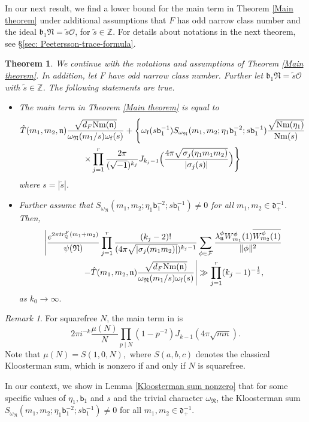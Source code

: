 \documentclass[reqno]{amsart}
\theoremstyle{plain}
\newtheorem{theorem}{Theorem}
\theoremstyle{definition}
\theoremstyle{remark}
\newtheorem{remark}{Remark}
\def\Nr{\mathrm{Nm}}
\def\b{\mathtt b}
\begin{document}
In our next result, we find a lower bound for the main term in Theorem \ref{Main theorem} under additional assumptions that $F$ has odd narrow class number and the ideal $\mathfrak{b}_1\mathfrak{N}= \tilde{s}\mathcal{O} $, for $\tilde{s}\in \mathbb{Z}$.  
For details about notations in the next theorem, see \S\ref{sec: Peetersson-trace-formula}.
\begin{theorem}\label{Single term}
 We continue with the notations and assumptions of Theorem \ref{Main theorem}. In addition, let $F$ have odd narrow class number.  Further let $\mathfrak{b}_1\mathfrak{N}=\tilde{s}\mathcal{O} $ with $\tilde{s}\in \mathbb{Z}$. The following statements are true.
 \begin{itemize}
 \item[{\bf(a)}] The main term in Theorem \ref{Main theorem} is equal to
\begin{multline*}
\Hat{T}(m_1,m_2,\mathfrak{n})\frac{\sqrt{d_F\Nr (\mathfrak{n})}}{\omega_\mathfrak{N}(m_1/s)\omega_{\mathrm{f}}(s)} + \Bigg\{ \omega_{\mathrm{f}}(s\b_1^{-1} ) S_{\omega_\mathfrak{N}} (m_1,m_2;\eta_1 \b_1^{-2};s\b_1^{-1})  \frac{\sqrt{\Nr (\eta_1)}}{\Nr(s)} \\\times \prod_{j=1}^r\frac{2\pi}{(\sqrt{-1})^{k_j}}J_{k_j-1} \Big(  \frac{4 \pi\sqrt{\sigma_j (\eta_1 m_1m_2 )}}{|\sigma_j(s)|}\Big)
 \Bigg\} 
 \end{multline*}
 where $s=|\tilde{s}|.$
  \item[{\bf(b)}]   
Further assume that  $S_{\omega_\mathfrak{N}} (m_{1},m_{2};\eta_1 \b_1^{-2};s\b_1^{-1})\neq 0$ for all $m_1,m_2 \in \mathfrak{d}^{-1}_+$. Then, 
\begin{align*}
 \Bigg| \frac{e^{2\pi tr_{\mathbb{Q}}^F ( m_{1}+ m_{2})}}{{\psi(\mathfrak{N})}} \prod_{j=1}^r  \frac{(k_j-2)!}{(4\pi \sqrt{|\sigma_j( m_{1} m_{2})|})^{k_j-1}} 
& \sum_{{\phi}\in \mathcal{F} }\frac{\lambda_\mathfrak{n}^\phi W_{ m_{1}}^\phi(1) \overline{W_{ m_{2}}^\phi(1)}}{\|\phi\|^2}\\ - \Hat{T}( m_{1}, m_{2},\mathfrak{n})\frac{\sqrt{d_F\Nr(\mathfrak{n})}}{\omega_\mathfrak{N}( m_{1}/s)\omega_{\mathrm{f}}(s)}\Bigg| 
 &\gg \prod_{j=1}^r (k_j-1)^{-\frac{1}{3}},
\end{align*}
as $k_0\rightarrow  \infty.$
\end{itemize}
\end{theorem}
\begin{remark}
        For squarefree $N$, the main term in \cite[Theorem 1.7]{JS} is $$2\pi i^{-k}\frac{\mu(N)}{N} \prod_{p\mid N}  (1-p^{-2})J_{k-1}(4\pi\sqrt{mn}). $$ Note that $\mu(N)=S(1,0, N),$ where $S(a,b,c)$ denotes the classical Kloosterman sum, which is nonzero if and only if $N$ is squarefree. 
 

In our context, we show  in Lemma \ref{Kloosterman sum nonzero} that for some specific values of $\eta_1,\b_1$ and $s$ and the trivial character $\omega_\mathfrak{N}$, the Kloosterman sum  $S_{\omega_\mathfrak{N}} (m_{1},m_{2};\eta_1 \b_1^{-2};s\b_1^{-1})\neq 0$ for all $m_1,m_2 \in \mathfrak{d}^{-1}_+$.  
\end{remark}
\end{document}
